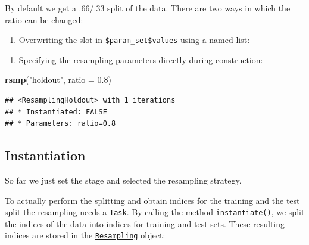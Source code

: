 \documentclass[]{scrbook}
\newenvironment{Shaded}{\begin{snugshade}}{\end{snugshade}}
\newcommand{\DataTypeTok}[1]{\textcolor[rgb]{0.13,0.29,0.53}{#1}}
\newcommand{\FloatTok}[1]{\textcolor[rgb]{0.00,0.00,0.81}{#1}}
\newcommand{\KeywordTok}[1]{\textcolor[rgb]{0.13,0.29,0.53}{\textbf{#1}}}
\newcommand{\NormalTok}[1]{#1}
\newcommand{\OperatorTok}[1]{\textcolor[rgb]{0.81,0.36,0.00}{\textbf{#1}}}
\newcommand{\StringTok}[1]{\textcolor[rgb]{0.31,0.60,0.02}{#1}}
\providecommand{\tightlist}{%
  \setlength{\itemsep}{0pt}\setlength{\parskip}{0pt}}
\renewenvironment{Shaded} {\begin{snugshade}\small} {\end{snugshade}}
\begin{document}
By default we get a .66/.33 split of the data.
There are two ways in which the ratio can be changed:

\begin{enumerate}
\def\labelenumi{\arabic{enumi}.}
\tightlist
\item
  Overwriting the slot in \texttt{\$param\_set\$values} using a named list:
\end{enumerate}

\begin{Shaded}
\end{Shaded}

\begin{enumerate}
\def\labelenumi{\arabic{enumi}.}
\setcounter{enumi}{1}
\tightlist
\item
  Specifying the resampling parameters directly during construction:
\end{enumerate}

\begin{Shaded}
\begin{Highlighting}[]
\KeywordTok{rsmp}\NormalTok{(}\StringTok{"holdout"}\NormalTok{, }\DataTypeTok{ratio =} \FloatTok{0.8}\NormalTok{)}
\end{Highlighting}
\end{Shaded}

\begin{verbatim}
## <ResamplingHoldout> with 1 iterations
## * Instantiated: FALSE
## * Parameters: ratio=0.8
\end{verbatim}

\hypertarget{resampling-inst}{%
\subsection{Instantiation}\label{resampling-inst}}

So far we just set the stage and selected the resampling strategy.

To actually perform the splitting and obtain indices for the training and the test split the resampling needs a \href{https://mlr3.mlr-org.com/reference/Task.html}{\texttt{Task}}.
By calling the method \texttt{instantiate()}, we split the indices of the data into indices for training and test sets.
These resulting indices are stored in the \href{https://mlr3.mlr-org.com/reference/Resampling.html}{\texttt{Resampling}} object:
\end{document}
